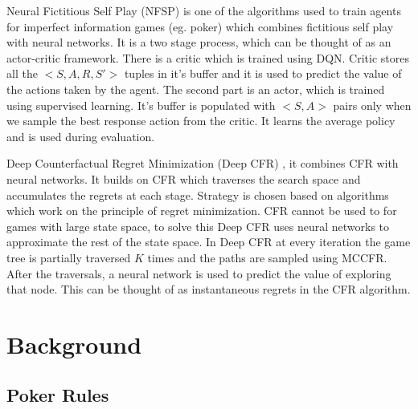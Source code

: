 \documentclass{article}
\begin{document}
Neural Fictitious Self Play (NFSP) \cite{nsfp:2016} is one of the algorithms used to train agents for imperfect information games (eg. poker) which combines fictitious self play with neural networks. It is a two stage process, which can be thought of as an actor-critic framework. There is a critic which is trained using DQN. Critic stores all the $<S, A, R, S'>$ tuples in it's buffer and it is used to predict the value of the actions taken by the agent. The second part is an actor, which is trained using supervised learning. It's buffer is populated with $<S, A>$ pairs only when we sample the best response action from the critic. It learns the average policy and is used during evaluation.



Deep Counterfactual Regret Minimization (Deep CFR) \cite{dcfr:2018}, it combines CFR with neural networks. It builds on CFR which traverses the search space and accumulates the regrets at each stage. Strategy is chosen based on algorithms which work on the principle of regret minimization. CFR cannot be used to for games with large state space, to solve this Deep CFR uses neural networks to approximate the rest of the state space. In Deep CFR at every iteration the game tree is partially traversed $K$ times and the paths are sampled using MCCFR. After the traversals, a neural network is used to predict the value of exploring that node. This can be thought of as instantaneous regrets in the CFR algorithm. 


\section{Background}

\subsection{Poker Rules} %
\end{document}
